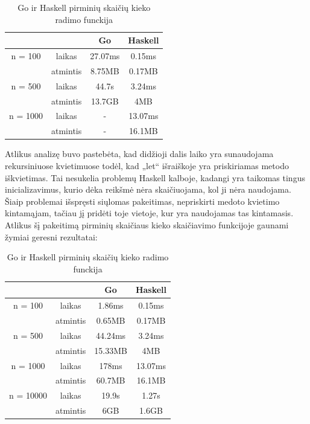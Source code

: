 \documentclass{VUMIFPSkursinis}
\begin{document}
	\begin{center}
		\centering
		\begin{table}[h]
			\caption{Go ir Haskell pirminių skaičių kieko radimo funckija}
			\centering
		\begin{tabular}{ cccc } 
		& & \textbf{Go} & \textbf{Haskell}  \\
		\midrule
		n = 100 & laikas & 27.07ms & 0.15ms    \\
		& atmintis & 8.75MB & 0.17MB \\
		\midrule
		n = 500 & laikas & 44.7s & 3.24ms  \\
		& atmintis & 13.7GB & 4MB \\
		\midrule
		n = 1000 & laikas & - & 13.07ms  \\
		& atmintis & - & 16.1MB \\
		\end{tabular}
		\centering
	\end{table}
		\end{center}
		Atlikus analizę buvo pastebėta, kad didžioji dalis laiko yra sunaudojama rekursiniuose kvietimuose todėl, kad „let“ išraiškoje yra priskiriamas metodo iškvietimas. Tai nesukelia problemų Haskell kalboje, kadangi  yra taikomas tingus inicializavimus, kurio dėka reikšmė nėra skaičiuojama, kol ji nėra naudojama. Šiaip problemai išspręsti siųlomas pakeitimas, nepriskirti medoto kvietimo kintamąjam, tačiau jį pridėti toje vietoje, kur yra naudojamas tas kintamasis. Atlikus šį pakeitimą pirminių skaičiaus kieko skaičiavimo funkcijoje gaunami žymiai geresni rezultatai:
		\begin{center}
			\centering
			\begin{table}[h]
				\caption{Go ir Haskell pirminių skaičių kieko radimo funckija}
				\centering
			\begin{tabular}{ cccc } 
			& & \textbf{Go} & \textbf{Haskell}  \\
			\midrule
			n = 100 & laikas & 1.86ms & 0.15ms    \\
			& atmintis & 0.65MB & 0.17MB \\
			\midrule
			n = 500 & laikas & 44.24ms & 3.24ms  \\
			& atmintis & 15.33MB & 4MB \\
			\midrule
			n = 1000 & laikas & 178ms & 13.07ms  \\
			& atmintis & 60.7MB & 16.1MB \\
			\midrule
			n = 10000 & laikas & 19.9s & 1.27s  \\
			& atmintis & 6GB & 1.6GB \\
			\end{tabular}
			\centering
		\end{table}
			\end{center}
\end{document}
